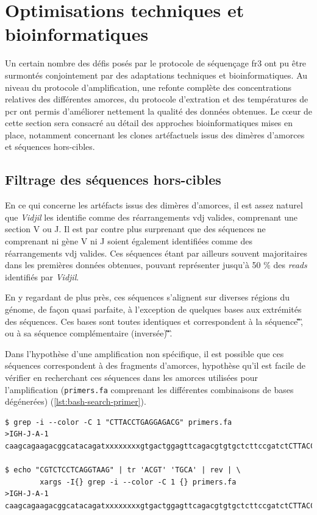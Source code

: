 \section{Optimisations techniques et bioinformatiques}

Un certain nombre des défis posés par le protocole de séquençage \gls{fr}3 ont
pu être surmontés conjointement par des adaptations techniques et
bioinformatiques. Au niveau du protocole d'amplification, une refonte complète
des concentrations relatives des différentes amorces, du protocole d'extration
et des températures de \gls{pcr} ont permis d'améliorer nettement la qualité
des données obtenues. Le cœur de cette section sera consacré au détail des
approches bioinformatiques mises en place, notamment concernant les clones
artéfactuels issus des dimères d'amorces et séquences hors-cibles.

\subsection{Filtrage des séquences hors-cibles}

En ce qui concerne les artéfacts issus des dimères d'amorces, il est assez
naturel que \textit{Vidjil} les identifie comme des réarrangements \gls{vdj}
valides, comprenant une section V ou J. Il est par contre plus surprenant que
des séquences ne comprenant ni gène V ni J soient également identifiées comme
des réarrangements \gls{vdj} valides. Ces séquences étant par ailleurs souvent
majoritaires dans les premières données obtenues, pouvant représenter jusqu'à
50 \% des \textit{reads} identifiés par \textit{Vidjil}.

En y regardant de plus près, ces séquences s'alignent sur diverses régions du
génome, de façon quasi parfaite, à l'exception de quelques bases aux extrémités
des séquences. Ces bases sont toutes identiques et correspondent à la séquence
\C\G\T\C\T\C\C\T\C\A\G\G\T\A\A\G, ou à sa séquence complémentaire (inversée)
\C\T\T\A\C\C\T\G\A\G\G\A\G\A\C\G.

Dans l'hypothèse d'une amplification non spécifique, il est possible que ces
séquences correspondent à des fragments d'amorces, hypothèse qu'il est facile
de vérifier en recherchant ces séquences dans les amorces utilisées pour
l'amplification (\texttt{primers.fa} comprenant les différentes combinaisons de
bases dégénerées) (\autoref{lst:bash-search-primer}).

\begin{lstlisting}[language=custombash, 
caption={Commande Bash et résultat de la recherche des séquences dans les amorces dégénérées.},
label={lst:bash-search-primer},
basicstyle=\ttfamily\scriptsize]
$ grep -i --color -C 1 "CTTACCTGAGGAGACG" primers.fa
>IGH-J-A-1
caagcagaagacggcatacagatxxxxxxxxgtgactggagttcagacgtgtgctcttccgatctCTTACCTGAGGAGACGgtgacc

$ echo "CGTCTCCTCAGGTAAG" | tr 'ACGT' 'TGCA' | rev | \
        xargs -I{} grep -i --color -C 1 {} primers.fa
>IGH-J-A-1
caagcagaagacggcatacagatxxxxxxxxgtgactggagttcagacgtgtgctcttccgatctCTTACCTGAGGAGACGgtgacc
\end{lstlisting}

